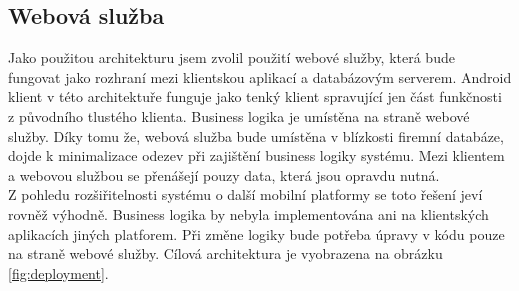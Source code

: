 \documentclass{diplomka}
\begin{document}
\subsection{Webová služba}
Jako použitou architekturu jsem zvolil použití webové služby, která bude fungovat jako rozhraní mezi klientskou aplikací a databázovým serverem. Android klient v této architektuře funguje jako tenký klient spravující jen část funkčnosti z původního tlustého klienta. Business logika je umístěna na straně webové služby. Díky tomu že, webová služba bude umístěna v blízkosti firemní databáze, dojde k minimalizace odezev při zajištění business logiky systému. Mezi klientem a webovou službou se přenášejí pouzy data, která jsou opravdu nutná. \\ \indent
Z pohledu rozšiřitelnosti systému o další mobilní platformy se toto řešení jeví rovněž výhodně. Business logika by nebyla implementována ani na klientských aplikacích jiných platforem. Při změne logiky bude potřeba úpravy v kódu pouze na straně webové služby. Cílová architektura je vyobrazena na obrázku \ref{fig:deployment}.

\newpage
\end{document}
